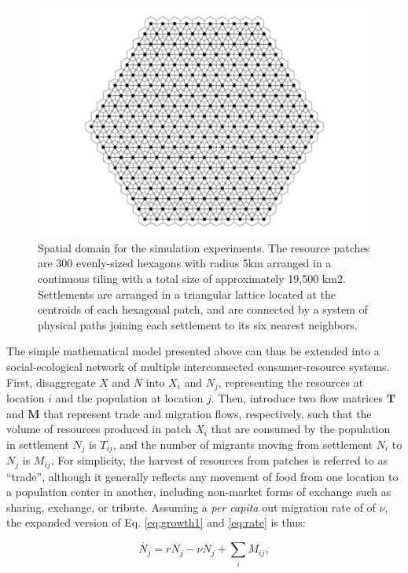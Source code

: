 \documentclass{article}
\begin{document}
\begin{figure}
    \centering
    \includegraphics[width=.7\columnwidth]{images/spatial-domain.png}
    \caption[Spatial domain for the simulation experiments]{Spatial domain for the simulation experiments. The resource patches are 300 evenly-sized hexagons with radius 5km arranged in a continuous tiling with a total size of approximately 19,500 km2. Settlements are arranged in a triangular lattice located at the centroids of each hexagonal patch, and are connected by a system of physical paths joining each settlement to its six nearest neighbors.}
    \label{fig:spatial-domain}
\end{figure}

The simple mathematical model presented above can thus be extended into a social-ecological network of multiple interconnected consumer-resource systems. First, disaggregate $X$ and $N$ into $X_i$ and $N_j$, representing the resources at location $i$ and the population at location $j$. Then, introduce two flow matrices $\mathbf{T}$ and $\mathbf{M}$ that represent trade and migration flows, respectively, such that the volume of resources produced in patch $X_i$ that are consumed by the population in settlement $N_j$ is $T_{ij}$, and the number of migrants moving from settlement $N_i$ to $N_j$ is $M_{ij}$. For simplicity, the harvest of resources from patches is referred to as ``trade'', although it generally reflects any movement of food from one location to a population center in another, including non-market forms of exchange such as sharing, exchange, or tribute. Assuming a \emph{per capita} out migration rate of of $\nu$, the expanded version of Eq. \ref{eq:growth1} and \ref{eq:rate} is thus:

\begin{equation}
\dot{N_j} = rN_j - \nu N_j + \sum_i M_{ij},
\label{eq:growth2}
\end{equation}
\end{document}
